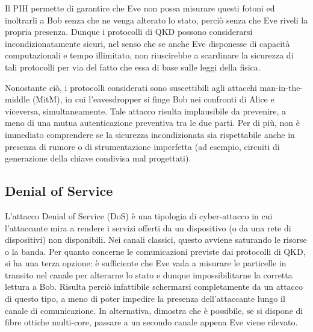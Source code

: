 Il PIH permette di garantire che Eve non possa misurare questi fotoni ed inoltrarli a Bob senza che ne venga alterato lo stato, perciò senza che Eve riveli la propria presenza. Dunque i protocolli di QKD possono considerarsi incondizionatamente sicuri, nel senso che se anche Eve disponesse di capacità computazionali e tempo illimitato, non riuscirebbe a scardinare la sicurezza di tali protocolli per via del fatto che essa di base sulle leggi della fisica.

Nonostante ciò, i protocolli considerati sono suscettibili agli attacchi man-in-the-middle (MitM), in cui l'eavesdropper si finge Bob nei confronti di Alice e viceversa, simultaneamente. Tale attacco risulta implausibile da prevenire, a meno di una mutua autenticazione preventiva tra le due parti. Per di più, non è immediato comprendere se la sicurezza incondizionata sia rispettabile anche in presenza di rumore o di strumentazione imperfetta (ad esempio, circuiti di generazione della chiave condivisa mal progettati).

\subsection{Denial of Service}
L'attacco Denial of Service (DoS) è una tipologia di cyber-attacco in cui l'attaccante mira a rendere i servizi offerti da un dispositivo (o da una rete di dispositivi) non disponibili. Nei canali classici, questo avviene saturando le risorse o la banda. Per quanto concerne le comunicazioni previste dai protocolli di QKD, si ha una terza opzione: è sufficiente che Eve vada a misurare le particelle in transito nel canale per alterarne lo stato e dunque impossibilitarne la corretta lettura a Bob. Risulta perciò infattibile schermarsi completamente da un attacco di questo tipo, a meno di poter impedire la presenza dell'attaccante lungo il canale di comunicazione. In alternativa, \cite{ddos_mitigation_sdn} dimostra che è possibile, se si dispone di fibre ottiche multi-core, passare a un secondo canale appena Eve viene rilevato.


